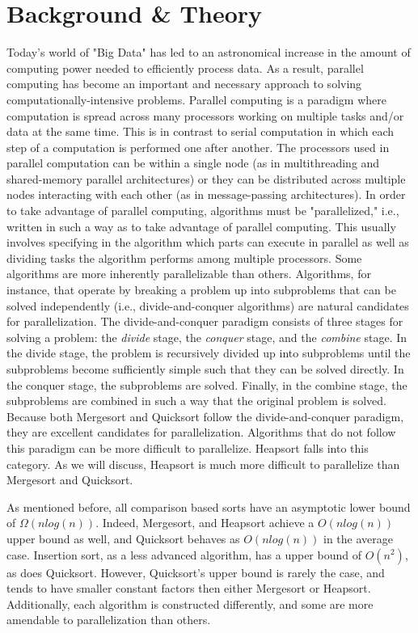 \documentclass[conference]{IEEEtran}
\begin{document}
\section{Background \& Theory}
Today's world of "Big Data" has led to an astronomical increase in the amount of computing power needed to efficiently process data.
As a result, parallel computing has become an important and necessary approach to solving computationally-intensive problems.
Parallel computing is a paradigm where computation is spread across many processors working on multiple tasks and/or data at the same time. This is in contrast to serial computation in which each step of a computation is performed one after another.
The processors used in parallel computation can be within a single node (as in multithreading and shared-memory parallel architectures) or they can be distributed across multiple nodes interacting with each other (as in message-passing architectures). In order to take advantage of parallel computing, algorithms must be "parallelized," i.e., written in such a way as to take advantage of parallel computing. This usually involves specifying in the algorithm which parts can execute in parallel as well as dividing tasks the algorithm performs among multiple processors. Some algorithms are more inherently parallelizable than others. Algorithms, for instance, that operate by breaking a problem up into subproblems that can be solved independently (i.e., divide-and-conquer algorithms) are natural candidates for parallelization. The divide-and-conquer paradigm consists of three stages for solving a problem: the \textit{divide} stage, the \textit{conquer} stage, and the \textit{combine} stage. In the divide stage, the problem is recursively divided up into subproblems until the subproblems become sufficiently simple such that they can be solved directly. In the conquer stage, the subproblems are solved. Finally, in the combine stage, the subproblems are combined in such a way that the original problem is solved. Because both Mergesort and Quicksort follow the divide-and-conquer paradigm, they are excellent candidates for parallelization. Algorithms that do not follow this paradigm can be more difficult to parallelize. Heapsort falls into this category. As we will discuss, Heapsort is much more difficult to parallelize than Mergesort and Quicksort.

As mentioned before, all comparison based sorts have an asymptotic lower bound of $\Omega(nlog(n))$. 
Indeed,  Mergesort, and Heapsort achieve a $O(nlog(n))$ upper bound as well, and Quicksort behaves as $O(nlog(n))$ in the average case. 
Insertion sort, as a less advanced algorithm, has a upper bound of $O(n^2)$, as does Quicksort. \cite{cormen_introduction_2009} 
However, Quicksort's upper bound is rarely the case, and tends to have smaller constant factors then either Mergesort or Heapsort. \cite{hoare_algorithm_1961} %
Additionally, each algorithm is constructed differently, and some are more amendable to parallelization than others.
\end{document}
